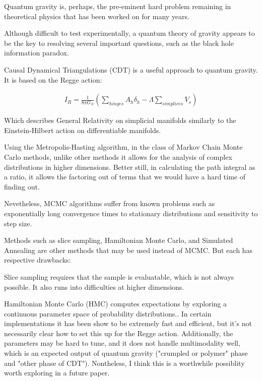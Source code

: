 \documentclass[12pt]{article}
\begin{document}
Quantum gravity is, perhaps, the pre-eminent hard problem\cite{steve_carlip_why_2014} remaining in theoretical physics that has been worked on for many years\cite{rovelli_notes_2000}.

Although difficult to test experimentally, a quantum theory of gravity appears to be the key to resolving several important
questions, such as the black hole information paradox.

Causal Dynamical Triangulations (CDT) \cite{j._ambjorn_dynamically_2001} is a useful approach to
quantum gravity. It is based on the Regge action\cite{regge_general_1961}:

\begin{align}
  I_{R}=\frac{1}{8\pi G_{N}}\left(\sum\limits_{hinges}A_{h}\delta_{h}-\Lambda\sum\limits_{simplices}V_{s}\right)
\end{align}

Which describes General Relativity on simplicial manifolds similarly to the Einstein-Hilbert action on differentiable manifolds.

Using the Metropolis-Hasting algorithm, in the class of Markov Chain Monte Carlo methods, unlike other methods it allows
for the analysis of complex distributions in higher dimensions. Better still, in calculating the path integral as a ratio, it allows
the factoring out of terms that we would have a hard time of finding out.

Nevetheless, MCMC algorithms suffer from known problems such as exponentially long convergence times to stationary distributions and sensitivity to step size.

Methods such as slice sampling, Hamiltonian Monte Carlo, and Simulated Annealing are other methods that may be used instead of MCMC.
But each has respective drawbacks:

Slice sampling requires that the sample is evaluatable, which is not always possible. It also runs into difficulties at higher dimensions.

Hamiltonian Monte Carlo (HMC) computes expectations by exploring a continuous parameter space of probability distributions.\cite{betancourt_conceptual_2017}. In certain implementations
it has been show to be extremely fast and efficient\cite{hoffman_no-u-turn_2011}, but it's not necessarily clear how to set this up for the Regge action. Additionally, the parameters may be hard to tune, and it does not handle multimodality well, which is an expected output of quantum gravity ("crumpled or polymer" phase and "other phase of CDT"). Nontheless, I think this is a worthwhile possiblity worth exploring in a future paper.
\end{document}
